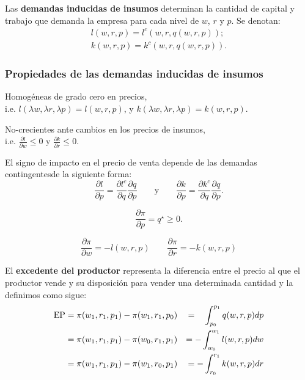 \documentclass[8pt,a4paper]{extarticle}
\begin{document}
\begin{multicols}{3}
\begin{boxdef}
	Las \textbf{demandas inducidas de insumos} determinan la cantidad de capital y trabajo que demanda la empresa para cada nivel de $w$, $r$ y $p$. Se denotan:
	\begin{gather*}
		l(w,r,p) = l^c (w, r, q(w, r, p)); \\
		k(w, r, p) = k^c(w, r, q(w, r, p))
	.\end{gather*}
\end{boxdef}

\sectionbreak

\subsubsection{Propiedades de las demandas inducidas de insumos}

\begin{eqlist}
\item Homogéneas de grado cero en precios,\\ i.e. $l(\lambda w, \lambda r, \lambda p) = l(w, r, p)$, y $k(\lambda w, \lambda r, \lambda p) = k(w, r, p)$.
\item No-crecientes ante cambios en los precios de insumos, \\ i.e. $\displaystyle \frac{\partial l}{\partial w} \le 0$ y $\displaystyle \frac{\partial k}{\partial r} \le 0$.
\item El signo de impacto en el precio de venta depende de las demandas contingentesde la siguiente forma:
	\[
		\frac{\partial l}{\partial p} = \frac{\partial l^c}{\partial q} \frac{\partial q}{\partial p} \qquad \text{y} \qquad \frac{\partial k}{\partial p} = \frac{\partial k^c}{\partial q} \frac{\partial q}{\partial p}
	.\] 
\end{eqlist}

\begin{boxlemma}
	\[
	\frac{\partial \pi}{\partial p} = q^\star \ge 0
	.\] 
\end{boxlemma}

\begin{boxcor}
	\[
		\frac{\partial \pi}{\partial w} = - l (w, r, p) \qquad \frac{\partial \pi}{\partial r} = - k (w, r, p)
\]
\end{boxcor}

\begin{boxdef}
	El \textbf{excedente del productor} representa la diferencia entre el precio al que el productor vende y su disposición para vender una determinada cantidad y la definimos como sigue:
\begin{equation*}
	\begin{aligned}
		\text{\normalfont EP} &= \pi(w_1, r_1, p_1) - \pi(w_1, r_1, p_0) &= \phantom{-} \int_{p_0}^{p_1} q(w,r,p)dp \\
							  &= \pi(w_1, r_1, p_1) - \pi(w_0, r_1, p_1) &= - \int_{w_0}^{w_1} l(w,r,p)dw \\
							  &= \pi(w_1, r_1, p_1) - \pi(w_1, r_0, p_1) &= - \int_{r_0}^{r_1} k(w,r,p)dr
	\end{aligned}
\end{equation*}
\end{boxdef}


\end{multicols}
\end{document}
